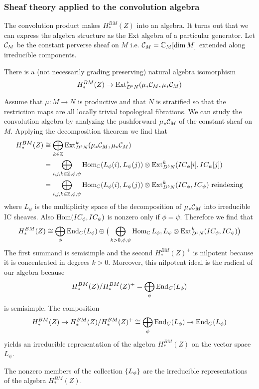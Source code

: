\subsubsection{Sheaf theory applied to the convolution algebra}
The convolution product makes $H^{BM}_*(Z)$ into an algebra. 
It turns out that we can express the algebra structure as 
the Ext algebra of a particular generator. Let ${\mathcal{C}}_M$ be the constant 
perverse sheaf on $M$ i.e. ${\mathcal{C}}_M = \mathbb{C}_M[\dim M]$ extended along irreducible
components.

\begin{proposition}
    There is a (not necessarily grading preserving) natural algebra 
    isomorphism \begin{align*}
        H^{BM}_*(Z) \to \operatorname{Ext}^*_{D^bN}(\mu_*{\mathcal{C}}_M,\mu_*{\mathcal{C}}_M)
    \end{align*} 
\end{proposition}

Assume that $\mu:M\to N$ is productive and that $N$ is stratified
 so that the restriction maps are all locally trivial topological fibrations.
 We can study the convolution algebra by analyzing the pushforward
 $\mu_*{\mathcal{C}}_M$ of the constant sheaf on $M$. Applying the 
 decomposition theorem we find that \begin{align*}
    H^{BM}_*(Z) &\cong \bigoplus_{k\in \mathbb{Z}} \operatorname{Ext}^k_{D^bN}(\mu_*{\mathcal{C}}_M,\mu_*{\mathcal{C}}_M) \\
    &= \bigoplus_{i,j,k\in\mathbb{Z},\phi,\psi} \operatorname{Hom}_{\mathbb{C}}(L_\phi(i),L_\psi(j))\otimes \operatorname{Ext}^k_{D^bN}(IC_\phi[i],IC_\psi[j]) \\
    &= \bigoplus_{i,j,k\in\mathbb{Z},\phi,\psi} \operatorname{Hom}_{\mathbb{C}}(L_\phi(i),L_\psi(j))\otimes \operatorname{Ext}^k_{D^bN}(IC_\phi,IC_\psi) \text{ reindexing}
 \end{align*}
where $L_\psi$ is the multiplicity space of the decomposition of $\mu_*{\mathcal{C}}_M$ into irreducible 
IC sheaves.
Also $\operatorname{Hom}(IC_\phi,IC_\psi)$ is nonzero only if $\phi = \psi$. Therefore 
we find that \begin{align*}
    H^{BM}_*(Z) \cong \bigoplus_\phi \operatorname{End}_C(L_\phi) \oplus \big(\bigoplus_{k>0,\phi,\psi} \operatorname{Hom}_{\mathbb{C}}{L_\phi,L_\psi}\otimes
    \operatorname{Ext}^k_{D^bN}(IC_\phi,IC_\psi)\big)
\end{align*} The first summand is semisimple and the second $H^{BM}_*(Z)^+$ is nilpotent because
it is concentrated in degrees $k>0$. Moreover, this nilpotent ideal is the radical 
of our algebra because 
\begin{align*}
    H^{BM}_*(Z) / H^{BM}_*(Z)^+ = \bigoplus_\phi \operatorname{End}_C(L_\phi)
\end{align*} is semisimple. The composition \begin{align*}
    H^{BM}_*(Z) \to H^{BM}_*(Z) / H^{BM}_*(Z)^+ \cong \bigoplus_\phi \operatorname{End}_C(L_\phi) \twoheadrightarrow \operatorname{End}_C(L_\phi)
\end{align*} yields an irreducible representation of the algebra $H^{BM}_*(Z)$ on the vector space $L_\psi$.
\begin{theorem}
    The nonzero members of the collection $\{L_\phi\}$ are the 
    irreducible representations of the algebra $H^{BM}_*(Z)$.
\end{theorem}

